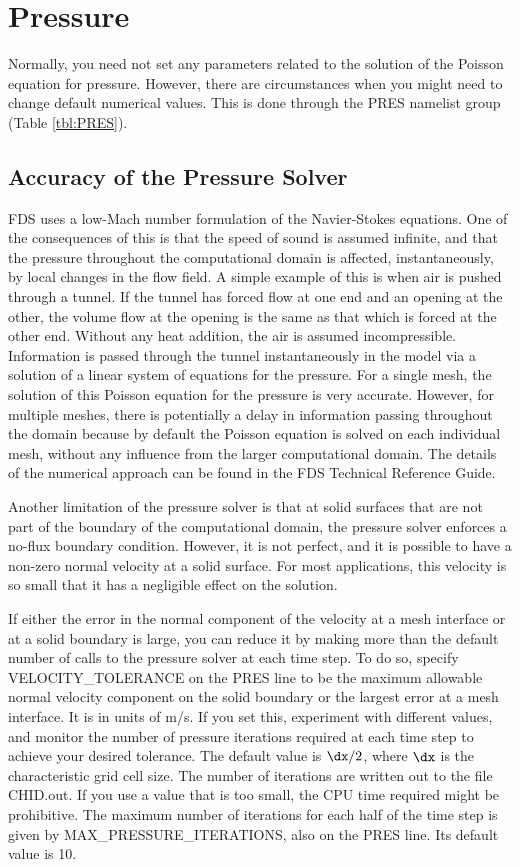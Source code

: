 \documentclass[11pt]{book}
\begin{document}
\chapter{Pressure}
\label{info:PRES}

Normally, you need not set any parameters related to the solution of the Poisson equation for pressure. However, there are circumstances when you might need to change default numerical values. This is done through the {\ct PRES} namelist group (Table \ref{tbl:PRES}).

\section{Accuracy of the Pressure Solver}

FDS uses a low-Mach number formulation of the Navier-Stokes equations. One of the consequences of this is that the speed of sound is assumed infinite, and that the pressure throughout the computational domain is affected, instantaneously, by local changes in the flow field. A simple example of this is when air is pushed through a tunnel. If the tunnel has forced flow at one end and an opening at the other, the volume flow at the opening is the same as that which is forced at the other end. Without any heat addition, the air is assumed incompressible. Information is passed through the tunnel instantaneously in the model via a solution of a linear system of equations for the pressure. For a single mesh, the solution of this Poisson equation for the pressure is very accurate. However, for multiple meshes, there is potentially a delay in information passing throughout the domain because by default the Poisson equation is solved on each individual mesh, without any influence from the larger computational domain. The details of the numerical approach can be found in the FDS Technical Reference Guide.

Another limitation of the pressure solver is that at solid surfaces that are not part of the boundary of the computational domain, the pressure solver enforces a no-flux boundary condition. However, it is not perfect, and it is possible to have a non-zero normal velocity at a solid surface. For most applications, this velocity is so small that it has a negligible effect on the solution.

If either the error in the normal component of the velocity at a mesh interface or at a solid boundary is large, you can reduce it by making more than the default number of calls to the pressure solver at each time step. To do so, specify {\ct VELOCITY\_TOLERANCE} on the {\ct PRES} line to be the maximum allowable normal velocity component on the solid boundary or the largest error at a mesh interface. It is in units of m/s. If you set this, experiment with different values, and monitor the number of pressure iterations required at each time step to achieve your desired tolerance. The default value is $\dx/2$, where $\dx$ is the characteristic grid cell size. The number of iterations are written out to the file {\ct CHID.out}. If you use a value that is too small, the CPU time required might be prohibitive. The maximum number of iterations for each half of the time step is given by {\ct MAX\_PRESSURE\_ITERATIONS}, also on the {\ct PRES} line. Its default value is 10.
\end{document}
